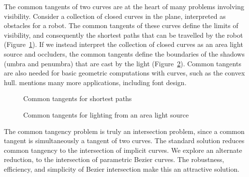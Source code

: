 \documentclass[9pt,twocolumn]{article}
\begin{document}
The common tangents of two curves are at the heart of many problems
involving visibility.
Consider a collection of closed curves in the plane, interpreted as 
obstacles for a robot.
The common tangents of these curves define the limits of visibility,
and consequently the shortest paths that can be travelled by the robot
(Figure~\ref{fig:applications}).
If we instead interpret the collection of closed curves as 
an area light source and occluders,
the common tangents define the boundaries of the shadows (umbra and 
penumbra) that are cast by the light (Figure~\ref{fig:appl2}).
Common tangents are also needed for basic geometric computations with curves,
such as the convex hull.
\cite{parida95} mentions many more applications, including font design.



\begin{figure}
\hspace{1in} \setjjdush
\caption{Common tangents for shortest paths}
\label{fig:applications}
\end{figure}



\begin{figure}
\hspace{1in} \setjjdulig
\caption{Common tangents for lighting from an area light source}
\label{fig:appl2}
\end{figure}

The common tangency problem is truly an intersection problem,
since a common tangent is simultaneously a tangent of two curves.
The standard solution reduces common tangency to the intersection of implicit curves.
We explore an alternate reduction, 
to the intersection of parametric Bezier curves.
The robustness, efficiency, and simplicity of Bezier intersection
make this an attractive solution.
\end{document}
